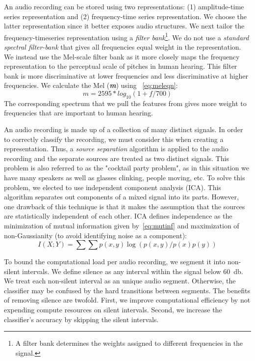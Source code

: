 %
An audio recording can be stored using two representations: (1) amplitude-time
series representation and (2) frequency-time series representation.
%
We choose the latter representation since it better exposes audio structures.
%
We next tailor the frequency-timeseries representation using a \textit{filter
bank}\footnote{A filter bank determines the weights assigned to different
frequencies in the signal.}.
%
We do not use a \textit{standard spectral filter-bank} that gives all
frequencies equal weight in the representation.
%
We instead use the Mel-scale filter bank as it more closely maps the frequency
representation to the perceptual scale of pitches in human hearing.
%
This filter bank is more discriminative at lower frequencies and 
less discriminative at higher frequencies.
%
We calculate the Mel (\textbf{\textit{m}}) using ~\cref{eq:meleqn}:
\begin{equation} \label{eq:meleqn}
    \textit{m} = 2595 * log_{10}(1+\textit{f}/700)
\end{equation}
%
%
The corresponding spectrum that we pull the features from gives more weight to
frequencies that are important to human hearing.

%
An audio recording is made up of a collection of many distinct signals.
%
In order to correctly classify the recording, we must consider this when
creating a representation. 
%
Thus, a \textit{source separation} algorithm is applied to the audio recording
and the separate sources are treated as two distinct signals. 
%
This problem is also referred to as the "cocktail party problem", as in this
situation we have many speakers as well as glasses clinking, people moving, etc.
% 
To solve this problem, we elected to use independent component analysis (ICA).
%
This algorithm separates out components of a mixed signal into its parts.
%
However, one drawback of this technique is that it makes the assumption that 
the sources are statistically independent of each other. 
%
ICA defines independence as the minimization of mutual information given
by~\cref{eq:mutinf} and maximization of non-Gaussianity (to avoid identifying
noise as a component):
\begin{equation} \label{eq:mutinf}
    I(X;Y) = \sum\sum p(x,y)\log(p(x,y)/p(x)p(y))
\end{equation}
%

%
To bound the computational load per audio recording, we segment it into
non-silent intervals.
%
We define silence as any interval within the signal below 60~db. 
%
We treat each non-silent interval as an unique audio segment.
%
Otherwise, the classifier may be confused by the hard transitions between
segments.
%
The benefits of removing silence are twofold.
%
First, we improve computational efficiency by not expending compute resources 
on silent intervals.
%
Second, we increase the classifier's accuracy by skipping the silent intervals.

